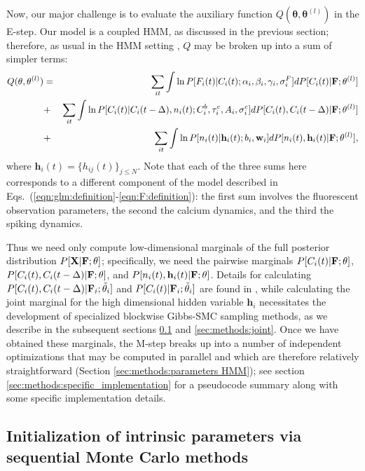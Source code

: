 \documentclass[aoas,preprint]{imsart}
\newcommand{\bth}{\mathbf{\theta}}
\newcommand{\w}{w}
\newcommand{\bw}{\mathbf{\w}}
\newcommand{\bF}{{\bf F}}
\newcommand{\bX}{{\bf X}}
\newcommand{\bh}{\mathbf{h}}
\newcommand{\tbth}{\tilde{\bth}}
\begin{document}
Now, our major challenge is to evaluate the auxiliary function
$Q(\bth,\bth^{(l)})$ in the E-step. Our model is a coupled HMM, as
discussed in the previous section; therefore, as usual in the HMM
setting \cite{RAB89}, $Q$ may be broken up into a sum of simpler
terms:
\begin{eqnarray} Q(\bth,\bth^{(l)}) &=& \sum_{it} \int \ln
  P[F_i(t)|C_i(t); \alpha_i, \beta_i, \gamma_i, \sigma^F_i] dP[C_i(t)
  | \bF; \theta^{(l)}] \nonumber \\ &+& \sum_{it} \int \ln P[C_i(t) |
  C_i(t-\Delta), n_i(t); C^b_i, \tau^c_i, A_i, \sigma^c_i] dP[C_i(t),
  C_i(t-\Delta) | \bF; \theta^{(l)}] \nonumber \\ &+& \sum_{it} \int
  \ln P[n_i(t)| \bh_i(t); b_i, \bw_i] dP[n_i(t), \bh_i(t) | \bF;
  \bth^{(l)}],
\label{eqn:loglik:definition-expl}
\end{eqnarray}
where $\bh_i(t)=\{h_{ij}(t)\}_{j \leq N}$. Note that each of the three
sums here corresponds to a different component of the model described
in Eqs.~(\ref{eqn:glm:definition}-\ref{eqn:F:definition}): the first
sum involves the fluorescent observation parameters, the second the
calcium dynamics, and the third the spiking dynamics.

Thus we need only compute low-dimensional marginals of the full
posterior distribution $P[\bX | \bF; \bth]$; specifically, we need the
pairwise marginals $P[C_i(t)| \bF; \bth]$, $P[C_i(t), C_i(t- \Delta) |
\bF; \bth]$, and $P[n_i(t),\bh_i(t) | \bF; \bth]$.  Details for
calculating $P[C_i(t), C_i(t- \Delta) | \bF_i; \tbth_i]$ and $P[C_i(t)
| \bF_i; \tbth_i]$ are found in \cite{Vogelstein2009}, while
calculating the joint marginal for the high dimensional hidden
variable $\bh_i$ necessitates the development of specialized blockwise
Gibbs-SMC sampling methods, as we describe in the subsequent sections
\ref{sec:methods:indep} and \ref{sec:methods:joint}. Once we have
obtained these marginals, the M-step breaks up into a number of
independent optimizations that may be computed in parallel and which
are therefore relatively straightforward (Section
\ref{sec:methods:parameters HMM}); see section
\ref{sec:methods:specific_implementation} for a pseudocode summary
along with some specific implementation details.

\subsection{Initialization of intrinsic parameters via sequential
  Monte Carlo methods} \label{sec:methods:indep}
\end{document}

